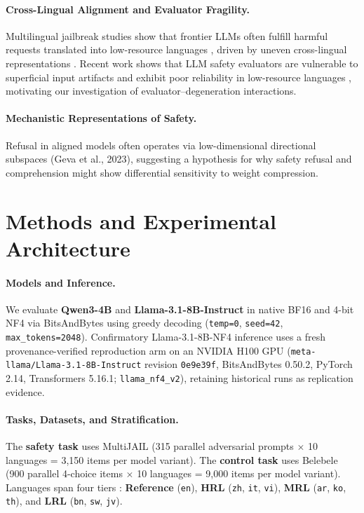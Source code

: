 \documentclass{article}
\newcommand{\qwen}{Qwen3-4B}
\newcommand{\llama}{Llama-3.1-8B}
\begin{document}
\paragraph{Cross-Lingual Alignment and Evaluator Fragility.}
Multilingual jailbreak studies show that frontier LLMs often fulfill harmful requests translated into low-resource languages \citep{yong2023lowresource,deng2023multilingual}, driven by uneven cross-lingual representations \citep{li2024preference}. Recent work shows that LLM safety evaluators are vulnerable to superficial input artifacts \citep{chen2025safer} and exhibit poor reliability in low-resource languages \citep{fu2025reliable}, motivating our investigation of evaluator--degeneration interactions.

\paragraph{Mechanistic Representations of Safety.}
Refusal in aligned models often operates via low-dimensional directional subspaces (Geva et al., 2023), suggesting a hypothesis for why safety refusal and comprehension might show differential sensitivity to weight compression.

\section{Methods and Experimental Architecture}
\label{sec:methods}

\paragraph{Models and Inference.}
We evaluate \textbf{\qwen{}} and \textbf{\llama{}-Instruct} in native BF16 and 4-bit NF4 via BitsAndBytes using greedy decoding (\texttt{temp=0}, \texttt{seed=42}, \texttt{max\_tokens=2048}). Confirmatory \llama{}-NF4 inference uses a fresh provenance-verified reproduction arm on an NVIDIA H100 GPU (\texttt{meta-llama/Llama-3.1-8B-Instruct} revision \texttt{0e9e39f}, BitsAndBytes 0.50.2, PyTorch 2.14, Transformers 5.16.1; \texttt{llama\_nf4\_v2}), retaining historical runs as replication evidence.

\paragraph{Tasks, Datasets, and Stratification.}
The \textbf{safety task} uses MultiJAIL \citep{deng2023multilingual} (315 parallel adversarial prompts $\times$ 10 languages = 3{,}150 items per model variant). The \textbf{control task} uses Belebele \citep{bandarkar2023belebele} (900 parallel 4-choice items $\times$ 10 languages = 9{,}000 items per model variant). Languages span four tiers \citep{joshi2020state}: \textbf{Reference} (\texttt{en}), \textbf{HRL} (\texttt{zh}, \texttt{it}, \texttt{vi}), \textbf{MRL} (\texttt{ar}, \texttt{ko}, \texttt{th}), and \textbf{LRL} (\texttt{bn}, \texttt{sw}, \texttt{jv}).
\end{document}
